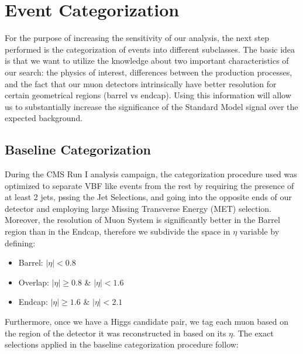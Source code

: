 \section{Event Categorization}\label{section:higgs_categorization}
For the purpose of increasing the sensitivity of our analysis, the next step performed is the categorization of events into different subclasses. The basic idea is that we want to utilize the knowledge about two important characteristics of our search: the physics of interest, differences between the production processes, and the fact that our muon detectors intrinsically have better resolution for certain geometrical regions (barrel vs endcap). Using this information will allow us to substantially increase the significance of the Standard Model signal over the expected background.

\subsection{Baseline Categorization}
During the CMS Run I analysis campaign, the categorization procedure used was optimized to separate VBF like events from the rest by requiring the presence of at least 2 jets, pssing the Jet Selections, and going into the opposite ends of our detector and employing large Missing Transverse Energy (MET) selection. Moreover, the resolution of Muon System is significantly better in the Barrel region than in the Endcap, therefore we subdivide the space in $\eta$ variable by defining:
\begin{itemize}
  \item Barrel: $|\eta| < 0.8$
  \item Overlap: $|\eta| \ge 0.8$ \& $|\eta| < 1.6$
  \item Endcap: $|\eta| \ge 1.6$ \& $|\eta| < 2.1$
\end{itemize}
Furthermore, once we have a Higgs candidate pair, we tag each muon based on the region of the detector it was reconstructed in based on its $\eta$. The exact selections applied in the baseline categorization procedure follow:
